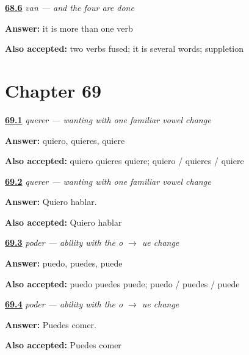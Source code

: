 \noindent\begin{minipage}[t]{\linewidth}
\raggedright
\hyperlink{review-ES-C10-van-lesson}{\textbf{68.6}} \emph{van — and the four are done}\par
\small \textbf{Answer:} it is more than one verb\par
\footnotesize \textbf{Also accepted:} two verbs fused; it is several words; suppletion
\end{minipage}\par\medskip

\section*{Chapter 69}

\noindent\begin{minipage}[t]{\linewidth}
\raggedright
\hyperlink{review-ES-C11-querer-singular-forms}{\textbf{69.1}} \emph{querer — wanting with one familiar vowel change}\par
\small \textbf{Answer:} quiero, quieres, quiere\par
\footnotesize \textbf{Also accepted:} quiero quieres quiere; quiero / quieres / quiere
\end{minipage}\par\medskip

\noindent\begin{minipage}[t]{\linewidth}
\raggedright
\hyperlink{review-ES-C11-querer-want-to-speak}{\textbf{69.2}} \emph{querer — wanting with one familiar vowel change}\par
\small \textbf{Answer:} Quiero hablar.\par
\footnotesize \textbf{Also accepted:} Quiero hablar
\end{minipage}\par\medskip

\noindent\begin{minipage}[t]{\linewidth}
\raggedright
\hyperlink{review-ES-C11-poder-singular-forms}{\textbf{69.3}} \emph{poder — ability with the o $\to$ ue change}\par
\small \textbf{Answer:} puedo, puedes, puede\par
\footnotesize \textbf{Also accepted:} puedo puedes puede; puedo / puedes / puede
\end{minipage}\par\medskip

\noindent\begin{minipage}[t]{\linewidth}
\raggedright
\hyperlink{review-ES-C11-poder-can-eat}{\textbf{69.4}} \emph{poder — ability with the o $\to$ ue change}\par
\small \textbf{Answer:} Puedes comer.\par
\footnotesize \textbf{Also accepted:} Puedes comer
\end{minipage}\par\medskip


